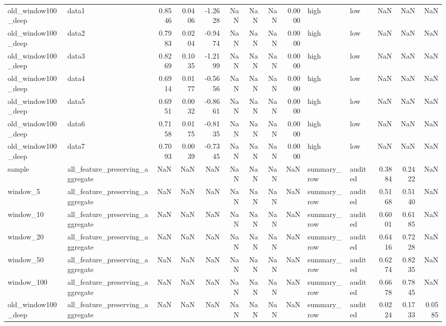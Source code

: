 \begin{tabular}{llrrrrrrrllrrr}
old_window100_deep & data1 & 0.8546 & 0.0406 & -1.2628 & NaN & NaN & NaN & 0.0000 & high & low & NaN & NaN & NaN \\
old_window100_deep & data2 & 0.7983 & 0.0204 & -0.9474 & NaN & NaN & NaN & 0.0000 & high & low & NaN & NaN & NaN \\
old_window100_deep & data3 & 0.8269 & 0.1035 & -1.2199 & NaN & NaN & NaN & 0.0000 & high & low & NaN & NaN & NaN \\
old_window100_deep & data4 & 0.6914 & 0.0177 & -0.5656 & NaN & NaN & NaN & 0.0000 & high & low & NaN & NaN & NaN \\
old_window100_deep & data5 & 0.6951 & 0.0032 & -0.8661 & NaN & NaN & NaN & 0.0000 & high & low & NaN & NaN & NaN \\
old_window100_deep & data6 & 0.7158 & 0.0175 & -0.8135 & NaN & NaN & NaN & 0.0000 & high & low & NaN & NaN & NaN \\
old_window100_deep & data7 & 0.7093 & 0.0039 & -0.7345 & NaN & NaN & NaN & 0.0000 & high & low & NaN & NaN & NaN \\
sample & all_feature_preserving_aggregate & NaN & NaN & NaN & NaN & NaN & NaN & NaN & summary_row & audited & 0.3884 & 0.2422 & NaN \\
window_5 & all_feature_preserving_aggregate & NaN & NaN & NaN & NaN & NaN & NaN & NaN & summary_row & audited & 0.5168 & 0.5140 & NaN \\
window_10 & all_feature_preserving_aggregate & NaN & NaN & NaN & NaN & NaN & NaN & NaN & summary_row & audited & 0.6001 & 0.6185 & NaN \\
window_20 & all_feature_preserving_aggregate & NaN & NaN & NaN & NaN & NaN & NaN & NaN & summary_row & audited & 0.6416 & 0.7228 & NaN \\
window_50 & all_feature_preserving_aggregate & NaN & NaN & NaN & NaN & NaN & NaN & NaN & summary_row & audited & 0.6274 & 0.8235 & NaN \\
window_100 & all_feature_preserving_aggregate & NaN & NaN & NaN & NaN & NaN & NaN & NaN & summary_row & audited & 0.6678 & 0.7845 & NaN \\
old_window100_deep & all_feature_preserving_aggregate & NaN & NaN & NaN & NaN & NaN & NaN & NaN & summary_row & audited & 0.0224 & 0.1733 & 0.0585 \\
\bottomrule
\end{tabular}
